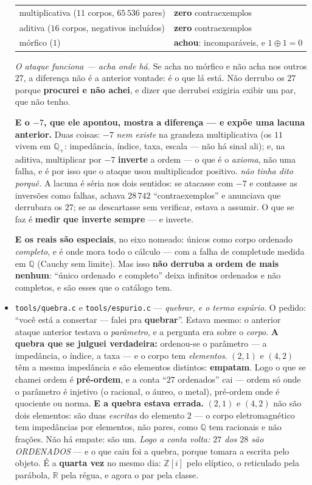 \documentclass[11pt]{article}
\newcommand{\code}[1]{\texttt{\small #1}}
\newcommand{\Z}{\mathbb Z}
\newcommand{\R}{\mathbb R}
\newcommand{\Q}{\mathbb Q}
\theoremstyle{plain}
\theoremstyle{remark}
\begin{document}
\begin{itemize}
\begin{center}\begin{tabular}{ll}
multiplicativa ($11$ corpos, $65\,536$ pares) & \textbf{zero} contraexemplos \\
aditiva ($16$ corpos, negativos incluídos) & \textbf{zero} contraexemplos \\
mórfico ($1$) & \textbf{achou}: incomparáveis, e $1 \oplus 1 = 0$ \\
\end{tabular}\end{center}

\emph{O ataque funciona --- acha onde há.} Se acha no mórfico e não acha nos outros $27$, a
diferença não é a anterior vontade: é o que lá está. Não derrubo os $27$ porque \textbf{procurei e não
achei}, e dizer que derrubei exigiria exibir um par, que não tenho.

\textbf{E o $-7$, que ele apontou, mostra a diferença --- e expõe uma lacuna anterior.} Duas coisas:
$-7$ \emph{nem existe} na grandeza multiplicativa (os $11$ vivem em $\Q_+$: impedância, índice,
taxa, escala --- não há sinal ali); e, na aditiva, multiplicar por $-7$ \textbf{inverte} a ordem
--- o que é o \emph{axioma}, não uma falha, e é por isso que o ataque usou multiplicador positivo.
\emph{não tinha dito porquê.} A lacuna é séria nos dois sentidos: se atacasse com $-7$ e
contasse as inversões como falhas, achava $28\,742$ ``contraexemplos'' e anunciava que derrubara os
$27$; se as descartasse sem verificar, estava a assumir. O que se faz é \textbf{medir que inverte
sempre} --- e inverte.

\textbf{E os reais são especiais}, no eixo nomeado: únicos como corpo ordenado \emph{completo}, e é
onde mora todo o cálculo --- com a falha de completude medida em $\Q$ (Cauchy sem limite). Mas isso
\textbf{não derruba a ordem de mais nenhum}: ``único ordenado \emph{e} completo'' deixa infinitos
ordenados e não completos, e são esses que o catálogo tem.
\item \code{tools/quebra.c} e \code{tools/espurio.c} --- \emph{quebrar, e o termo espúrio}.
O pedido: ``você está a consertar --- falei pra \textbf{quebrar}''. Estava mesmo: o anterior ataque
anterior testava o \emph{parâmetro}, e a pergunta era sobre o \emph{corpo}. \textbf{A quebra que se julguei
verdadeira:} ordenou-se o parâmetro --- a impedância, o índice, a taxa --- e o corpo tem
\emph{elementos}. $(2,1)$ e $(4,2)$ têm a mesma impedância e são elementos distintos:
\textbf{empatam}. Logo o que se chamei ordem é \textbf{pré-ordem}, e a conta ``$27$ ordenados''
cai --- ordem só onde o parâmetro é injetivo (o racional, o áureo, o metal), pré-ordem onde é
quociente ou norma. \textbf{E a quebra estava errada.} $(2,1)$ e $(4,2)$ não são dois elementos: são duas
\emph{escritas} do elemento $2$ --- o corpo eletromagnético tem impedâncias por elementos, não
pares, como $\Q$ tem racionais e não frações. Não há empate: são um. \emph{Logo a conta volta:
$27$ dos $28$ são ORDENADOS} --- e o que caiu foi a quebra, porque tomara a escrita pelo objeto.
É a \textbf{quarta vez} no mesmo dia: $\Z[i]$ pelo elíptico, o reticulado pela parábola, $\R$
pela régua, e agora o par pela classe.


\end{itemize}
\end{document}
